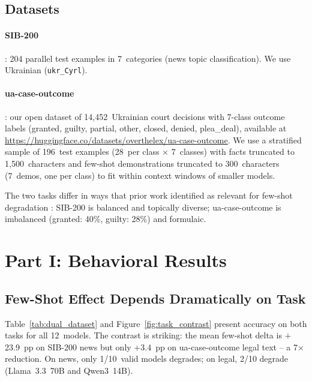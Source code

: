 \documentclass[11pt,a4paper]{article}
\begin{document}
\subsection{Datasets}

\paragraph{SIB-200} \citep{adelani2024sib200}: 204 parallel test examples in 7~categories (news topic classification). We use Ukrainian (\texttt{ukr\_Cyrl}).

\paragraph{ua-case-outcome}: our open dataset of 14,452~Ukrainian court decisions with 7-class outcome labels (granted, guilty, partial, other, closed, denied, plea\_deal), available at \url{https://huggingface.co/datasets/overthelex/ua-case-outcome}. We use a stratified sample of 196~test examples (28~per class $\times$ 7~classes) with facts truncated to 1,500~characters and few-shot demonstrations truncated to 300~characters (7~demos, one per class) to fit within context windows of smaller models.

The two tasks differ in ways that prior work identified as relevant for few-shot degradation \citep{ovcharov2026tokenizer}: SIB-200 is balanced and topically diverse; ua-case-outcome is imbalanced (granted: 40\%, guilty: 28\%) and formulaic.

\section{Part I: Behavioral Results}
\label{sec:behavioral_results}

\subsection{Few-Shot Effect Depends Dramatically on Task}

Table~\ref{tab:dual_dataset} and Figure~\ref{fig:task_contrast} present accuracy on both tasks for all 12~models. The contrast is striking: the mean few-shot delta is $+$23.9~pp on SIB-200 news but only $+$3.4~pp on ua-case-outcome legal text -- a 7$\times$ reduction. On news, only 1/10~valid models degrades; on legal, 2/10 degrade (Llama~3.3~70B and Qwen3~14B).
\end{document}
